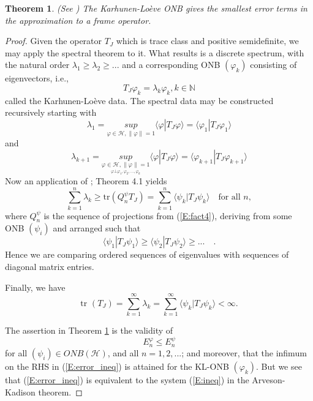 \documentclass{amsart}
\newtheorem{theorem}{Theorem}[section]
\theoremstyle{definition}
\theoremstyle{remark}
\numberwithin{equation}{section}
\begin{document}
\begin{theorem}
\label{T:6.1}
(See \cite{JS07}) The Karhunen-Lo\`{e}ve ONB gives 
the smallest error terms in the approximation to a frame operator.
\end{theorem}
\begin{proof}
Given the operator $T_{J}$ which is trace class and positive 
semidefinite, we may apply the spectral theorem to it. What results is 
a discrete spectrum, with the
natural order $\lambda_{1} \geq \lambda_{2} \geq ...$ and a corresponding ONB 
$(\varphi_{k})$ consisting of eigenvectors, i.e., 
\begin{equation}
\label{E:eigenvector}
T_{J}\varphi_{k}=\lambda_{k}\varphi_{k}, k \in \mathbb{N}
\end{equation}
called the Karhunen-Lo\`{e}ve data.  The spectral data may be constructed 
recursively starting with 
\begin{equation}
\label{E:lambda1}
\lambda_{1}=\underset{\varphi \in \mathcal{H}, \|\varphi\|=1}{sup}
\langle \varphi| T_{J}\varphi \rangle 
= \langle \varphi_{1}| T_{J}\varphi_{1} \rangle
\end{equation}
and
\begin{equation}
\label{E:lambdak+1}
\lambda_{k+1}=\underset{\underset{\varphi \bot \varphi_{1}, \varphi_{2}, ..., \varphi_{k}}
{\varphi \in \mathcal{H}, \|\varphi\|=1}}{sup}
\langle \varphi| T_{J}\varphi \rangle 
= \langle \varphi_{k+1}| T_{J}\varphi_{k+1} \rangle
\end{equation}
Now an application of \cite{ArKa06}; Theorem 4.1 yields 
\begin{equation}
\label{E:ineq}
\sum_{k=1}^{n}\lambda_{k} \geq \text{tr}(Q_{n}^{\psi}T_{J}) 
  = \sum_{k=1}^{n}\langle \psi_{k}| T_{J}\psi_{k} \rangle \quad \text{for all }n,
\end{equation} 
where $Q_{n}^{\psi}$ is the sequence of projections from (\ref{E:fact4}), 
deriving from some ONB $(\psi_{i})$ and arranged such that
\begin{equation}
\label{E:psi_ineq}
\langle \psi_{1} | T_{J}\psi_{1} \rangle \geq \langle \psi_{2} | T_{J}\psi_{2} \rangle 
\geq ... \quad \text{.} 
\end{equation}
Hence we are comparing ordered sequences of eigenvalues with sequences of 
diagonal matrix entries.

Finally, we have
\[
\text{tr }(T_{J})=\sum_{k=1}^{\infty} \lambda_{k} 
=\sum_{k=1}^{\infty} \langle \psi_{k} | T_{J}\psi_{k} \rangle < \infty.
\]

The assertion in Theorem \ref{T:6.1} is the validity of
\begin{equation}
\label{E:error_ineq}
E_{n}^{\varphi} \leq E_{n}^{\psi}
\end{equation}
for all $(\psi_{i}) \in ONB(\mathcal{H})$, and all $n=1,2,...$; and moreover, 
that the infimum on the RHS in (\ref{E:error_ineq}) is attained for the 
KL-ONB $(\varphi_{k})$. But we see that (\ref{E:error_ineq}) is equivalent 
to the system (\ref{E:ineq}) in the Arveson-Kadison theorem.
\end{proof}
\end{document}
